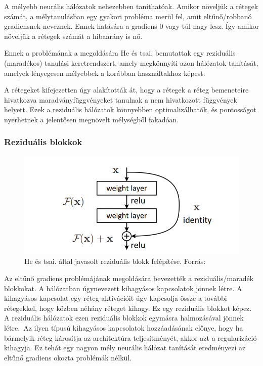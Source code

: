 \documentclass[12pt,a4]{article}
\begin{document}
    A mélyebb neurális hálózatok nehezebben taníthatóak. Amikor növeljük a rétegek számát, a mélytanulásban egy gyakori probléma merül fel, amit eltűnő/robbanó gradiensnek neveznek. Ennek hatására a gradiens 0 vagy túl nagy lesz. Így amikor növeljük a rétegek számát a hibaarány is nő. 
    
    Ennek a problémának a megoldására \cite{resnet}He és tsai. bemutattak egy reziduális (maradékos) tanulási keretrendszert, amely megkönnyíti azon hálózatok tanítását, amelyek lényegesen mélyebbek a korábban használtakhoz képest. 

     A rétegeket kifejezetten úgy alakították át, hogy a rétegek a réteg bemeneteire hivatkozva maradványfüggvényeket tanulnak a nem hivatkozott függvények helyett. Ezek a reziduális hálózatok könnyebben optimalizálhatók, és pontosságot nyerhetnek a jelentősen megnövelt mélységből fakadóan.

    \newpage
    \subsubsection{Reziduális blokkok}
    
    
    \begin{figure}[h]	
 		\centering
 		\includegraphics[width=1\linewidth]{Residual-Block}
 		\caption{He és tsai. által javasolt reziduális blokk felépítése.
 			Forrás:\cite{resnet}}
        \label{fig:resblock}
 	\end{figure}
  
    Az eltűnő gradiens problémájának megoldására bevezették a reziduális/maradék blokkokat. A hálózatban úgynevezett kihagyásos kapcsolatok jönnek létre. A kihagyásos kapcsolat egy réteg aktivációit úgy kapcsolja össze a további rétegekkel, hogy közben néhány réteget kihagy. Ez egy reziduális blokkot képez. A reziduális hálózatok ezen reziduális blokkok egymásra halmozásával jönnek létre. Az ilyen típusú kihagyásos kapcsolatok hozzáadásának előnye, hogy ha bármelyik réteg károsítja az architektúra teljesítményét, akkor azt a regularizáció kihagyja. Ez tehát egy nagyon mély neurális hálózat tanítását eredményezi az eltűnő gradiens okozta problémák nélkül. 
\end{document}
